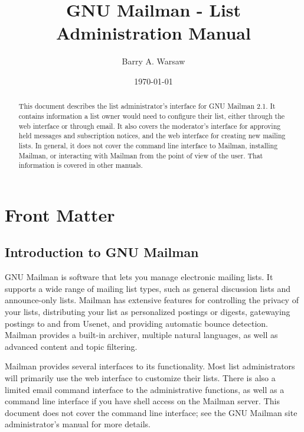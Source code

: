 \documentclass{howto}
\title{GNU Mailman - List Administration Manual}
\author{Barry A. Warsaw}
\date{\today}			%
\begin{document}
\maketitle

%
\ifhtml
\chapter*{Front Matter\label{front}}
\fi


\begin{abstract}
\noindent
This document describes the list administrator's interface for GNU
Mailman 2.1.  It contains information a list owner would need to
configure their list, either through the web interface or through
email.  It also covers the moderator's interface for approving held
messages and subscription notices, and the web interface for creating
new mailing lists.  In general, it does not cover the command line
interface to Mailman, installing Mailman, or interacting with Mailman
from the point of view of the user.  That information is covered in
other manuals.
\end{abstract}

\tableofcontents

\section{Introduction to GNU Mailman}

GNU Mailman is software that lets you manage electronic mailing lists.
It supports a wide range of mailing list types, such as general
discussion lists and announce-only lists.  Mailman has extensive
features for controlling the privacy of your lists, distributing your
list as personalized postings or digests, gatewaying postings to and
from Usenet, and providing automatic bounce detection.  Mailman
provides a built-in archiver, multiple natural languages, as well as
advanced content and topic filtering.

Mailman provides several interfaces to its functionality.  Most list
administrators will primarily use the web interface to customize their
lists.  There is also a limited email command interface to the
administrative functions, as well as a command line interface if you
have shell access on the Mailman server.  This document does not cover
the command line interface; see the GNU Mailman site administrator's
manual for more details.
\end{document}
